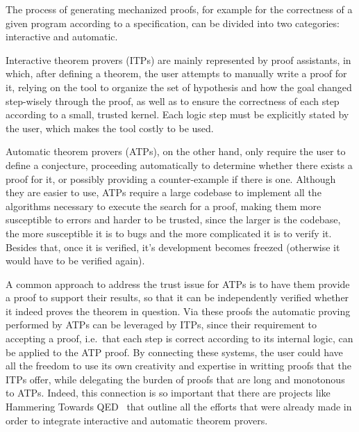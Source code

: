 The process of generating mechanized proofs, for example for the
correctness of a given program according to a specification, can be divided into
two categories: interactive and automatic.

Interactive theorem provers (ITPs) are mainly represented by proof assistants, in which, after defining
a theorem, the user attempts to manually write a proof for it,
relying on the tool to organize the set of hypothesis and
how the goal changed step-wisely through the proof, as well as to ensure the
correctness of each step according to a small, trusted kernel.
%
Each logic step must be explicitly stated by the user, which makes the tool
costly to be used.

Automatic theorem provers (ATPs), on the other hand,
only require the user to define a conjecture, proceeding automatically to
determine whether there exists a proof for it, or possibly providing a
counter-example if there is one.
%
Although they are easier to use, ATPs require a large
codebase to implement all the algorithms necessary to execute the search for a proof,
making them more susceptible to errors and harder to be trusted, since the
larger is the codebase, the more susceptible it is to bugs and the more complicated it is
to verify it. Besides that, once it is verified, it's development becomes freezed
(otherwise it would have to be verified again).

A common approach to address the trust issue for ATPs is to have them provide a
proof to support their results, so that it can be independently verified whether
it indeed proves the theorem in question.
%
Via these proofs the automatic proving performed by ATPs can be
leveraged by ITPs, since their requirement to accepting a proof, i.e.\ that each
step is correct according to its internal logic, can be applied to the ATP
proof.
%
By connecting these systems, the user could have all the freedom to use its own
creativity and expertise in writting proofs that the ITPs offer, while delegating
the burden of proofs that are long and monotonous to ATPs. Indeed, this
connection is so important that there are projects like Hammering Towards QED~\cite{hammering}
that outline all the efforts that were already made in order to integrate
interactive and automatic theorem provers.

